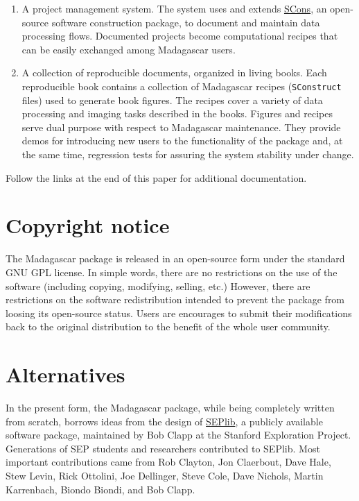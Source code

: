 \begin{enumerate}
\item A project management system. The system uses and extends
  \href{http://www.scons.org/}{SCons}, an open-source software
  construction package, to document and maintain data processing
  flows. Documented projects become computational recipes that can be
  easily exchanged among Madagascar users.
  
\item A collection of reproducible documents, organized in living
  books. Each reproducible book contains a collection of Madagascar
  recipes (\texttt{SConstruct} files) used to generate book
  figures. The recipes cover a variety of data processing and imaging
  tasks described in the books. Figures and recipes serve dual purpose
  with respect to Madagascar maintenance. They provide demos for
  introducing new users to the functionality of the package and, at
  the same time, regression tests for assuring the system stability
  under change.

\end{enumerate}

Follow the links at the end of this paper for additional documentation.

\section{Copyright notice}

The Madagascar package is released in an open-source form under the standard GNU GPL
license. In simple words, there are no restrictions on the use of the software
(including copying, modifying, selling, etc.) However, there are restrictions
on the software redistribution intended to prevent the package from loosing
its open-source status. Users are encourages to submit their modifications
back to the original distribution to the benefit of the whole user community.

\section{Alternatives} 

In the present form, the Madagascar package, while being completely
written from scratch, borrows ideas from the design of
\href{http://sepwww.stanford.edu/software/seplib/}{SEPlib}, a publicly
available software package, maintained by Bob Clapp at the Stanford
Exploration Project. Generations of SEP students and researchers
contributed to SEPlib. Most important contributions came from Rob
Clayton, Jon Claerbout, Dave Hale, Stew Levin, Rick Ottolini, Joe
Dellinger, Steve Cole, Dave Nichols, Martin Karrenbach, Biondo Biondi,
and Bob Clapp.

